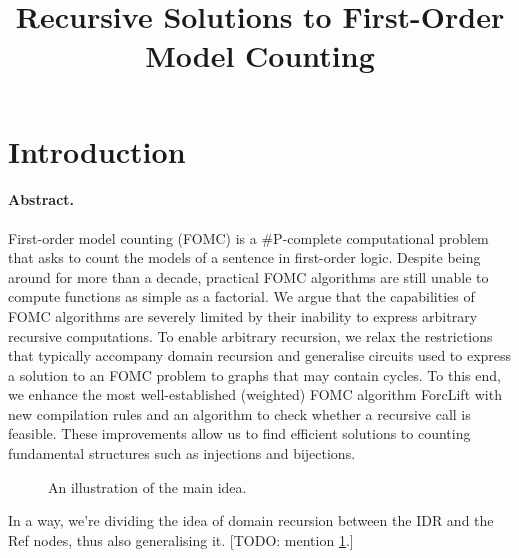 \documentclass{article}
\title{Recursive Solutions to First-Order Model Counting}
\theoremstyle{definition}
\theoremstyle{remark}
\begin{document}
\maketitle

\section{Introduction}

\paragraph{Abstract.} First-order model counting (FOMC) is a #P-complete computational problem that asks to count the models of a sentence in first-order logic. Despite being around for more than a decade, practical FOMC algorithms are still unable to compute functions as simple as a factorial. We argue that the capabilities of FOMC algorithms are severely limited by their inability to express arbitrary recursive computations. To enable arbitrary recursion, we relax the restrictions that typically accompany domain recursion and generalise circuits used to express a solution to an FOMC problem to graphs that may contain cycles. To this end, we enhance the most well-established (weighted) FOMC algorithm ForcLift with new compilation rules and an algorithm to check whether a recursive call is feasible. These improvements allow us to find efficient solutions to counting fundamental structures such as injections and bijections.

\begin{figure}[t]
  \centering
  \caption{An illustration of the main idea.}
  \label{fig:idea}
\end{figure}

In a way, we're dividing the idea of domain recursion between the IDR and the Ref nodes, thus also generalising it. [TODO: mention \cref{fig:idea}.]
\end{document}
